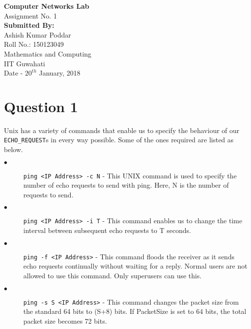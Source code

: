 \documentclass{article}
\begin{document}
\begin{center}

	\Huge
	\textbf{Computer Networks Lab}\\

	\huge
	Assignment No. 1 \\

	\vspace*{1.5cm}
	\Large
	\textbf{Submitted By:}\\
	\LARGE
	Ashish Kumar Poddar\\
	\large 
	Roll No.: 150123049\\
	Mathematics and Computing\\
	IIT Guwahati\\
	Date - $20^{th}$ January, 2018

\end{center}
	
	\section*{Question 1}
	\normalsize
	\paragraph{}Unix has a variety of commands that enable us to specify the behaviour of our \texttt{ECHO\_REQUEST}s in every way possible. Some of the ones required are listed as below. 

		\begin{description}
	
		\item[$\bullet$] \texttt{ping <IP Address> -c N} - This UNIX command is used to specify the number of echo requests to send with ping. Here, N is the number of requests to send.

		\item[$\bullet$] \texttt{ping <IP Address> -i T} - This command enables us to change the time interval between subsequent echo requests to T seconds.

		\item[$\bullet$] \texttt{ping -f <IP Address>} - This command floods the receiver as it sends echo requests continually without waiting for a reply. Normal users are not allowed to use this command. Only superusers can use this. 

		\item[$\bullet$] \texttt{ping -s S <IP Address>} - This command changes the packet size from the standard 64 bits to (S+8) bits. If PacketSize is set to 64 bits, the total packet size becomes 72 bits. 

	\end{description}
 
\end{document}
